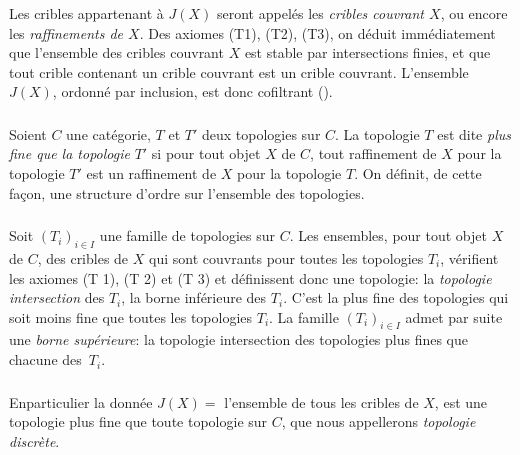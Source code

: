 \documentclass[10pt]{../fichiers-configuration-latex/smfart}
\begin{document}
\setcounter{subsection}{1}
\subsubsection{}

Les cribles appartenant à $J(X)$ seront appelés les \emph{cribles
  couvrant $X$}, ou encore les \emph{raffinements de $X$}. Des axiomes
  (T1), (T2), (T3), on déduit immédiatement que l'ensemble des
  cribles couvrant $X$ est stable par intersections finies, et que
  tout crible contenant un crible couvrant est un crible
  couvrant. L'ensemble $J(X)$, ordonné par inclusion, est donc
  cofiltrant ().

\subsubsection{}

Soient $C$ une catégorie, $T$ et $T'$ deux topologies sur $C$. La
topologie $T$ est dite \emph{plus fine que la topologie} $T'$ si
pour tout objet $X$ de $C$, tout raffinement de $X$ pour la
topologie $T'$ est un raffinement de $X$ pour la topologie $T$. On
définit, de cette façon, une structure d'ordre sur l'ensemble
des topologies.

\subsubsection{}

Soit $(T_i)_{i\in I}$ une famille de topologies sur $C$. Les
ensembles, pour tout objet $X$ de $C$, des cribles de $X$ qui sont
couvrants pour toutes les topologies $T_i$, vérifient les axiomes
(T 1), (T 2) et (T 3) et définissent donc une topologie: la
\emph{topologie intersection} des $T_i$, \ie la borne inférieure
des $T_i$. C'est la plus fine des topologies qui soit moins fine que
toutes les topologies $T_i$. La famille $(T_i)_{i \in I}$ admet par
suite une \emph{borne supérieure}: la topologie intersection des
topologies plus fines que chacune des~$T_i$.

\subsubsection{}
En\pageoriginale particulier la donnée $J(X)=$ l'ensemble de tous
les cribles de $X$, est une topologie plus fine que toute topologie
sur $C$, que nous appellerons \emph{topologie discrète}.
\end{document}
